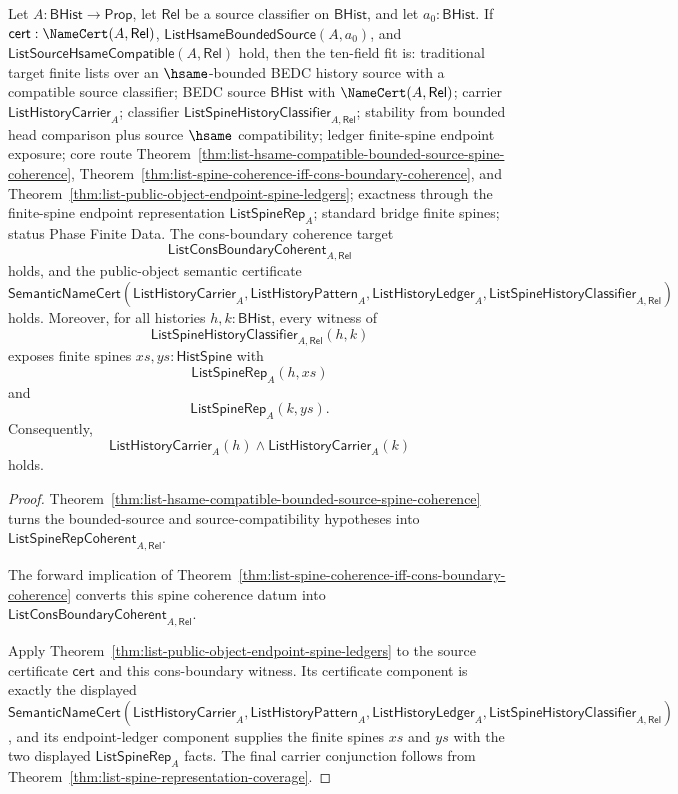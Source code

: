 \begin{theorem}
\label{thm:list-hsame-compatible-bounded-source-public-object-endpoint-spine-ledgers}
Let $A:\mathsf{BHist}\to\mathsf{Prop}$, let $\mathsf{Rel}$ be a source
classifier on $\mathsf{BHist}$, and let $a_0:\mathsf{BHist}$. If
$\mathsf{cert}:\NameCert(A,\mathsf{Rel})$,
$\mathsf{ListHsameBoundedSource}(A,a_0)$, and
$\mathsf{ListSourceHsameCompatible}(A,\mathsf{Rel})$ hold, then the ten-field
fit is: traditional target finite lists over an $\hsame$-bounded BEDC history
source with a compatible source classifier; BEDC source $\mathsf{BHist}$ with
$\NameCert(A,\mathsf{Rel})$; carrier $\mathsf{ListHistoryCarrier}_A$;
classifier $\mathsf{ListSpineHistoryClassifier}_{A,\mathsf{Rel}}$; stability
from bounded head comparison plus source $\hsame$ compatibility; ledger
finite-spine endpoint exposure; core route
Theorem~\ref{thm:list-hsame-compatible-bounded-source-spine-coherence},
Theorem~\ref{thm:list-spine-coherence-iff-cons-boundary-coherence}, and
Theorem~\ref{thm:list-public-object-endpoint-spine-ledgers}; exactness through
the finite-spine endpoint representation $\mathsf{ListSpineRep}_A$; standard
bridge finite spines; status Phase Finite Data. The cons-boundary coherence
target
$$
\mathsf{ListConsBoundaryCoherent}_{A,\mathsf{Rel}}
$$
holds, and the public-object semantic certificate
$$
\mathsf{SemanticNameCert}(\mathsf{ListHistoryCarrier}_A,
\mathsf{ListHistoryPattern}_A,
\mathsf{ListHistoryLedger}_A,
\mathsf{ListSpineHistoryClassifier}_{A,\mathsf{Rel}})
$$
holds. Moreover, for all histories $h,k:\mathsf{BHist}$, every witness of
$$
\mathsf{ListSpineHistoryClassifier}_{A,\mathsf{Rel}}(h,k)
$$
exposes finite spines $xs,ys:\mathsf{HistSpine}$ with
$$
\mathsf{ListSpineRep}_A(h,xs)
$$
and
$$
\mathsf{ListSpineRep}_A(k,ys).
$$
Consequently,
$$
\mathsf{ListHistoryCarrier}_A(h)\land\mathsf{ListHistoryCarrier}_A(k)
$$
holds.
\end{theorem}
\begin{proof}
Theorem~\ref{thm:list-hsame-compatible-bounded-source-spine-coherence} turns the
bounded-source and source-compatibility hypotheses into
$\mathsf{ListSpineRepCoherent}_{A,\mathsf{Rel}}$.

The forward implication of
Theorem~\ref{thm:list-spine-coherence-iff-cons-boundary-coherence} converts this
spine coherence datum into
$\mathsf{ListConsBoundaryCoherent}_{A,\mathsf{Rel}}$.

Apply Theorem~\ref{thm:list-public-object-endpoint-spine-ledgers} to the source
certificate $\mathsf{cert}$ and this cons-boundary witness. Its certificate
component is exactly the displayed
$\mathsf{SemanticNameCert}(\mathsf{ListHistoryCarrier}_A,
\mathsf{ListHistoryPattern}_A,\mathsf{ListHistoryLedger}_A,
\mathsf{ListSpineHistoryClassifier}_{A,\mathsf{Rel}})$, and its endpoint-ledger
component supplies the finite spines $xs$ and $ys$ with the two displayed
$\mathsf{ListSpineRep}_A$ facts. The final carrier conjunction follows from
Theorem~\ref{thm:list-spine-representation-coverage}.
\end{proof}

